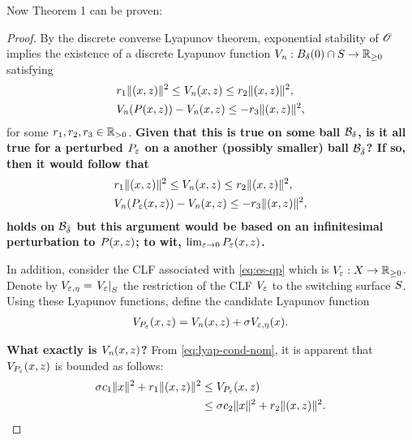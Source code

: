 \documentclass[twocolumn]{article}
\begin{document}
Now Theorem 1 can be proven:
\begin{proof}
  By the discrete converse Lyapunov theorem, exponential stability of $\Orbit$ implies the existence of a discrete Lyapunov function $\Vn : B_{\delta}(0) \cap \S \to \Rnn$ satisfying
  \begin{align}
    \nonumber
    &r_{1} \| (\zdx, \zdz) \|^{2} \leq \Vn(\zdx, \zdz) \leq r_{2} \| (\zdx, \zdz) \|^2,\\
    \label{eq:lyap-cond-nom}
    &\Vn(\P(\zdx, \zdz)) - \Vn(\zdx, \zdz) \leq -r_{3} \| (\zdx, \zdz) \|^{2},
  \end{align}
  for some $r_{1}, r_{2}, r_{3} \in \Rpd$.
  {\bf Given that this is true on some ball $\B_{\delta}$, is it all true for a perturbed $\Pe$ on a another (possibly smaller) ball $\B_{\bar \delta}$? If so, then it would follow that
    \begin{align}
      \nonumber
      &r_{1} \| (\zdx, \zdz) \|^{2} \leq \Vn(\zdx, \zdz) \leq r_{2} \| (\zdx, \zdz) \|^2,\\
      \label{eq:lyap-cond-pert}
      &\Vn(\P_{\resclfparam}(\zdx, \zdz)) - \Vn(\zdx, \zdz) \leq -r_{3} \| (\zdx, \zdz) \|^{2},
    \end{align}
    holds on $\B_{\bar \delta}$ but this argument would be based on an infinitesimal perturbation to $P(\zdx, \zdz)$; to wit, $\limeps \Pe(\zdx, \zdz)$.}

  In addition, consider the CLF associated with \eqref{eq:es-qp} which is $\Ve : \zdX \to \Rnn$.
  Denote by $\Vee = \VeS$ the restriction of the CLF $\Ve$ to the switching surface $\S$.
  Using these Lyapunov functions, define the candidate Lyapunov function
  \begin{align}
    \VP(\zdx, \zdz) = \Vn(\zdx, \zdz) + \sigma \Vee(\zdx).
  \end{align}

  {\bf What exactly is $\Vn(\zdx, \zdz)$?}
  From \eqref{eq:lyap-cond-nom}, it is apparent that $\VP(\zdx, \zdz)$ is bounded as follows:
  \begin{align}
    \sigma c_{1} \| \zdx \|^{2} + r_{1} \| (\zdx, \zdz) \|^{2} &\leq \VP(\zdx, \zdz)\\
    \nonumber
    &\leq \sigma c_{2} \| \zdx \|^{2} + r_{2} \| (\zdx, \zdz) \|^{2}.
  \end{align}
  

\end{proof}
\end{document}
